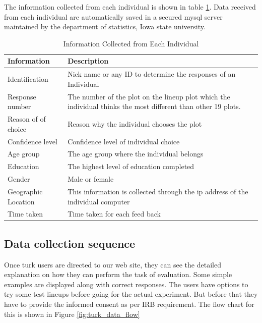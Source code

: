 \documentclass[11pt]{article}
\begin{document}
The information collected from each individual is shown in table \ref{tbl:data_info}. Data received from each individual are automatically saved in a secured mysql server maintained by the department of statistics, Iowa state university. 

\begin{table}[hbtp]
\caption{Information Collected from Each Individual}
\centering 
\begin{tabular}{lp{8cm}} 
\hline
Information &  Description \\ %
\hline
Identification & Nick name or any ID to determine the responses of an Individual \\
Response number & The number of the plot on the lineup plot which the individual thinks the most different than other 19 plots.\\ 
Reason of of choice & Reason why the individual chooses the plot \\
Confidence level & Confidence level of individual choice \\ 
Age group& The age group where the individual belongs \\
Education & The highest level of education completed \\
Gender & Male or female \\
Geographic Location & This information is collected through the ip address of the individual computer \\ 
Time taken & Time taken for each feed back\\
\hline
\end{tabular}
\label{tbl:data_info}
\end{table}	


\subsection{Data collection sequence} Once turk users are directed to our web site, they can see the detailed explanation on how they can perform the task of evaluation. Some simple examples are displayed along with correct responses. The users have options to try some test lineups before going for the actual experiment. But before that they have to provide the informed consent as per IRB requirement. The flow chart for this is shown in Figure \ref{fig:turk_data_flow}
\end{document}
